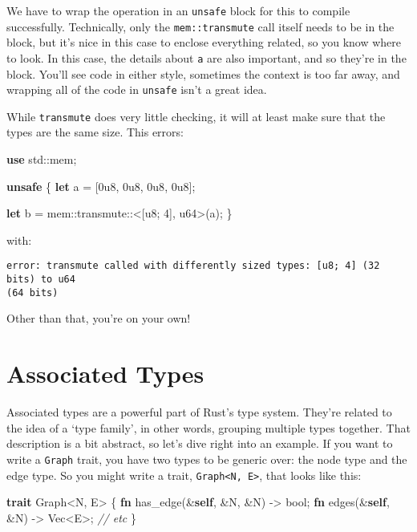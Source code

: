\documentclass[a4paper,]{book}
\newenvironment{Shaded}{\begin{snugshade}}{\end{snugshade}}
\newcommand{\KeywordTok}[1]{\textcolor[rgb]{0.13,0.29,0.53}{\textbf{{#1}}}}
\newcommand{\DataTypeTok}[1]{\textcolor[rgb]{0.13,0.29,0.53}{{#1}}}
\newcommand{\DecValTok}[1]{\textcolor[rgb]{0.00,0.00,0.81}{{#1}}}
\newcommand{\CommentTok}[1]{\textcolor[rgb]{0.56,0.35,0.01}{\textit{{#1}}}}
\newcommand{\NormalTok}[1]{{#1}}
\begin{document}
We have to wrap the operation in an \texttt{unsafe} block for this to
compile successfully. Technically, only the \texttt{mem::transmute} call
itself needs to be in the block, but it's nice in this case to enclose
everything related, so you know where to look. In this case, the details
about \texttt{a} are also important, and so they're in the block. You'll
see code in either style, sometimes the context is too far away, and
wrapping all of the code in \texttt{unsafe} isn't a great idea.

While \texttt{transmute} does very little checking, it will at least
make sure that the types are the same size. This errors:

\begin{Shaded}
\begin{Highlighting}[]
\KeywordTok{use} \NormalTok{std::mem;}

\KeywordTok{unsafe} \NormalTok{\{}
    \KeywordTok{let} \NormalTok{a = [}\DecValTok{0u8}\NormalTok{, }\DecValTok{0u8}\NormalTok{, }\DecValTok{0u8}\NormalTok{, }\DecValTok{0u8}\NormalTok{];}

    \KeywordTok{let} \NormalTok{b = mem::transmute::<[}\DataTypeTok{u8}\NormalTok{; }\DecValTok{4}\NormalTok{], }\DataTypeTok{u64}\NormalTok{>(a);}
\NormalTok{\}}
\end{Highlighting}
\end{Shaded}

with:

\begin{verbatim}
error: transmute called with differently sized types: [u8; 4] (32 bits) to u64
(64 bits)
\end{verbatim}

Other than that, you're on your own!

\hypertarget{sec--associated-types}{\section{Associated
Types}\label{sec--associated-types}}

Associated types are a powerful part of Rust's type system. They're
related to the idea of a `type family', in other words, grouping
multiple types together. That description is a bit abstract, so let's
dive right into an example. If you want to write a \texttt{Graph} trait,
you have two types to be generic over: the node type and the edge type.
So you might write a trait,
\texttt{Graph\textless{}N,\ E\textgreater{}}, that looks like this:

\begin{Shaded}
\begin{Highlighting}[]
\KeywordTok{trait} \NormalTok{Graph<N, E> \{}
    \KeywordTok{fn} \NormalTok{has_edge(&}\KeywordTok{self}\NormalTok{, &N, &N) -> }\DataTypeTok{bool}\NormalTok{;}
    \KeywordTok{fn} \NormalTok{edges(&}\KeywordTok{self}\NormalTok{, &N) -> }\DataTypeTok{Vec}\NormalTok{<E>;}
    \CommentTok{// etc}
\NormalTok{\}}
\end{Highlighting}
\end{Shaded}
\end{document}
